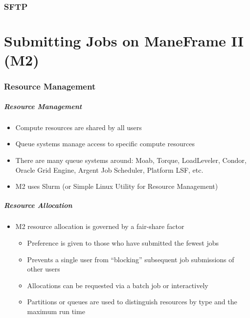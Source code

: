 \documentclass{beamer}
\begin{document}
\section{SFTP}

\begin{frame}

\end{frame}

\part{Submitting Jobs on ManeFrame II (M2)}

\section{Resource Management}

\begin{frame}
\frametitle{Resource Management}
\begin{itemize}
\item Compute resources are shared by all users
\item Queue systems manage access to specific compute resources
\item There are many queue systems around: Moab, Torque, LoadLeveler, Condor,
      Oracle Grid Engine, Argent Job Scheduler, Platform LSF, etc.
\item M2 uses Slurm (or Simple Linux Utility for Resource Management)
\end{itemize}
\end{frame}

\begin{frame}
\frametitle{Resource Allocation}
\begin{itemize}
\item M2 resource allocation is governed by a fair-share factor
\begin{itemize}
\item Preference is given to those who have submitted the fewest jobs
\item Prevents a single user from ``blocking'' subsequent job submissions of
      other users
\item Allocations can be requested via a batch job or interactively
\item Partitions or queues are used to distinguish resources by type and the
      maximum run time
\end{itemize}
\end{itemize}
\end{frame}
\end{document}
